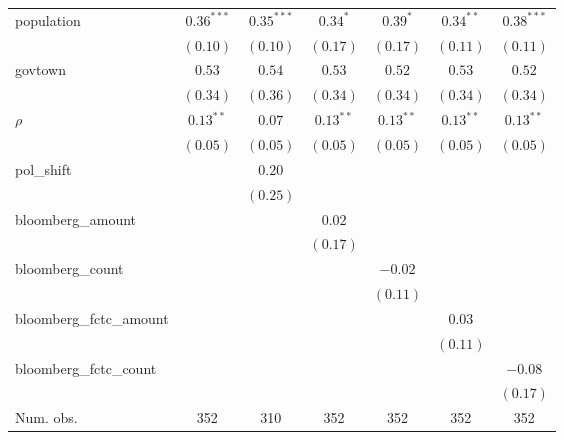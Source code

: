 \begin{table}[!h]
\begin{center}
\begin{tabular}{l c c c c c c }
population              & $0.36^{***}$ & $0.35^{***}$ & $0.34^{*}$   & $0.39^{*}$   & $0.34^{**}$  & $0.38^{***}$ \\
                        & $(0.10)$     & $(0.10)$     & $(0.17)$     & $(0.17)$     & $(0.11)$     & $(0.11)$     \\
govtown                 & $0.53$       & $0.54$       & $0.53$       & $0.52$       & $0.53$       & $0.52$       \\
                        & $(0.34)$     & $(0.36)$     & $(0.34)$     & $(0.34)$     & $(0.34)$     & $(0.34)$     \\
$\rho$                  & $0.13^{**}$  & $0.07$       & $0.13^{**}$  & $0.13^{**}$  & $0.13^{**}$  & $0.13^{**}$  \\
                        & $(0.05)$     & $(0.05)$     & $(0.05)$     & $(0.05)$     & $(0.05)$     & $(0.05)$     \\
pol\_shift              &              & $0.20$       &              &              &              &              \\
                        &              & $(0.25)$     &              &              &              &              \\
bloomberg\_amount       &              &              & $0.02$       &              &              &              \\
                        &              &              & $(0.17)$     &              &              &              \\
bloomberg\_count        &              &              &              & $-0.02$      &              &              \\
                        &              &              &              & $(0.11)$     &              &              \\
bloomberg\_fctc\_amount &              &              &              &              & $0.03$       &              \\
                        &              &              &              &              & $(0.11)$     &              \\
bloomberg\_fctc\_count  &              &              &              &              &              & $-0.08$      \\
                        &              &              &              &              &              & $(0.17)$     \\
\midrule
Num. obs.               & 352          & 310          & 352          & 352          & 352          & 352          \\

\end{tabular}
\end{center}
\end{table}
